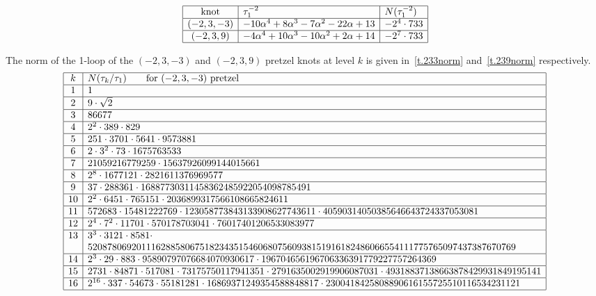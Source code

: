 \documentclass[12pt]{amsart}
\theoremstyle{definition}
\def\a{\alpha}
\def\be{  \begin{equation} }
\def\ee{  \end{equation} }
\begin{document}
\be
\label{eq.1loop239}
\begin{array}{|c|l|l|} \hline
\text{knot} & \tau_1^{-2} & N(\tau_1^{-2}) \\ \hline
(-2,3,-3) &  -10 \a^4 + 8 \a^3 - 7 \a^2 - 22 \a + 13 & - 2^4 \cdot 733 
\\ \hline
(-2,3,9) & -4 \a^4 + 10 \a^3 - 10 \a^2 + 2 \a + 14 & -2^7 \cdot 733 
\\ \hline
\end{array} 
\ee

The norm of the 1-loop of the $(-2,3,-3)$ and $(-2,3,9)$ pretzel knots
at level $k$ is given in~\eqref{t.233norm} and~\eqref{t.239norm}
respectively.
{\tiny
\be
\label{t.233norm}
\begin{array}{|c|l|} \hline
k & N(\tau_k/\tau_1) \qquad \text{for $(-2,3,-3)$ pretzel} \\ \hline
1 & 1 \\ \hline
2 & 9\cdot \sqrt{2} \\ \hline
3 & 86677 \\ \hline
4 & 2^2 \cdot 389 \cdot 829 \\ \hline
5 & 251 \cdot 3701 \cdot 5641 \cdot 9573881 \\ \hline
6 & 2 \cdot 3^2 \cdot 73 \cdot 1675763533 \\ \hline
7 & 21059216779259 \cdot 15637926099144015661 \\ \hline
8 & 2^8 \cdot 1677121 \cdot 2821611376969577 \\ \hline
9 & 37 \cdot 288361 \cdot 16887730311458362485922054098785491 \\ \hline
10 & 2^2 \cdot 6451 \cdot 765151 \cdot 2036899317566108665824611 \\ \hline
11 & 572683 \cdot 15481222769 \cdot 123058773843133908627743611 \cdot 
     40590314050385646643724337053081 \\ \hline
12 & 2^4 \cdot 7^2 \cdot 11701 \cdot 570178703041 \cdot 76017401206533083977 
\\ \hline
13 & 3^3 \cdot 3121 \cdot 8581 \cdot \\ &
5208780692011162885806751823435154606807560938151916182486066554111775765097437387670769 \\ \hline
14 & 2^3 \cdot 29 \cdot 883 \cdot 95890797076684070930617 \cdot 
     196704656196706336391779227757264369 \\ \hline
15 & 2731 \cdot 84871 \cdot 517081 \cdot 73175750117941351 \cdot 
2791635002919906087031 \cdot 
     49318837138663878429931849195141 \\ \hline
16 & 2^{16} \cdot 337 \cdot 54673 \cdot 55181281 \cdot 16869371249354588848817 
\cdot 
     2300418425808890616155725510116534231121
\\ \hline
\end{array}
\ee
}
\end{document}
